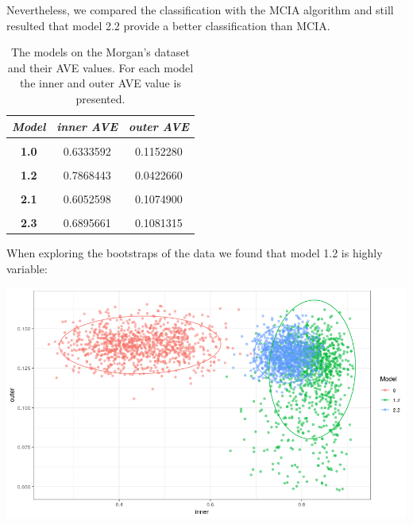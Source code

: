\documentclass[
  12pt,
  a4paper,
  twoside,
  openright]{book}
\let\origfigure\figure
\let\endorigfigure\endfigure
\renewenvironment{figure}[1][2] {
    \expandafter\origfigure\expandafter[!htp]
} {
    \endorigfigure
}
\begin{document}
Nevertheless, we compared the classification with the MCIA algorithm and still resulted that model 2.2 provide a better classification than MCIA.

\begin{table}[H]

\caption[The models on the Morgan's dataset and their AVE values.]{\label{tab:morgan-models-ave}The models on the Morgan's dataset and their AVE values. For each model the inner and outer AVE value is presented.}
\centering
\begin{tabular}[t]{|>{}c|c|>{}c|}
\hline
\em{\textbf{Model}} & \em{\textbf{inner AVE}} & \em{\textbf{outer AVE}}\\
\hline
\textbf{\cellcolor{gray!6}{0.0}} & \cellcolor{gray!6}{0.4735601} & \cellcolor{gray!6}{0.1098639}\\
\hline
\textbf{1.0} & 0.6333592 & 0.1152280\\
\hline
\textbf{\cellcolor{gray!6}{1.1}} & \cellcolor{gray!6}{0.2448234} & \cellcolor{gray!6}{0.1104746}\\
\hline
\textbf{1.2} & 0.7868443 & 0.0422660\\
\hline
\textbf{\cellcolor{gray!6}{2.0}} & \cellcolor{gray!6}{0.4404123} & \cellcolor{gray!6}{0.1088730}\\
\hline
\textbf{2.1} & 0.6052598 & 0.1074900\\
\hline
\textbf{\cellcolor{gray!6}{2.2}} & \cellcolor{gray!6}{0.6895661} & \cellcolor{gray!6}{0.1081315}\\
\hline
\textbf{2.3} & 0.6895661 & 0.1081315\\
\hline
\end{tabular}
\end{table}

When exploring the bootstraps of the data we found that model 1.2 is highly variable:

\begin{figure}
\includegraphics[width=1\linewidth]{images/morgan_bootstrap} \caption[AVE scores of bootstrapped models on Morgans' dataset.]{Inner and outer AVE scores of the bootstrapped models 0 1.2 and 2.2. Model 0 does not have sample data. Model 1.2 has microbiome, transcriptonme and sample data in a single block and model 2.2 has microbiome, transcriptome and the sample data split in several blocks.}\label{fig:morgan-bootstrap}
\end{figure}
\end{document}
